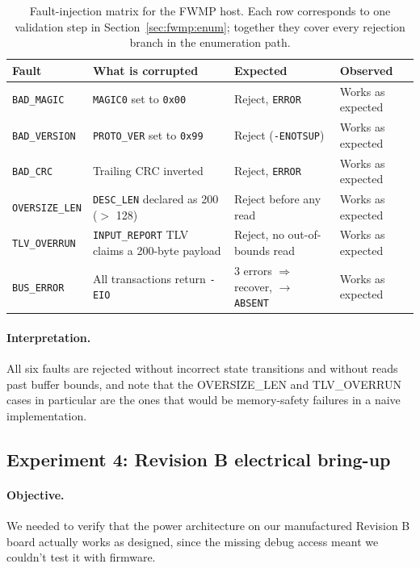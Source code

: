 \documentclass[12pt, a4paper]{article}
\begin{document}
\begin{table}[H]
\centering
\small
\begin{tabular}{@{}l p{5.6cm} l p{3.6cm}@{}}
\toprule
\textbf{Fault} & \textbf{What is corrupted} & \textbf{Expected} & \textbf{Observed} \\
\midrule
\texttt{BAD\_MAGIC} & \texttt{MAGIC0} set to \texttt{0x00} & Reject, \texttt{ERROR} & Works as expected \\
\texttt{BAD\_VERSION} & \texttt{PROTO\_VER} set to \texttt{0x99} & Reject (\texttt{-ENOTSUP}) & Works as expected \\
\texttt{BAD\_CRC} & Trailing CRC inverted & Reject, \texttt{ERROR} & Works as expected \\
\texttt{OVERSIZE\_LEN} & \texttt{DESC\_LEN} declared as 200 ($>$ 128) & Reject before any read & Works as expected \\
\texttt{TLV\_OVERRUN} & \texttt{INPUT\_REPORT} TLV claims a 200-byte payload & Reject, no out-of-bounds read & Works as expected \\
\texttt{BUS\_ERROR} & All transactions return \texttt{-EIO} & 3 errors $\Rightarrow$ recover, $\to$ \texttt{ABSENT} & Works as expected \\
\bottomrule
\end{tabular}
\caption{Fault-injection matrix for the FWMP host. Each row corresponds to one validation step in Section~\ref{sec:fwmp:enum}; together they cover every rejection branch in the enumeration path.}
\label{tab:faults}
\end{table}

\paragraph{Interpretation.} All six faults are rejected without incorrect state transitions and without
reads past buffer bounds, and note that the OVERSIZE\_LEN and TLV\_OVERRUN cases
in particular are the ones that would be memory-safety failures in a naive
implementation.

\subsection{Experiment 4: Revision B electrical bring-up}

\paragraph{Objective.} We needed to verify that the power architecture on our manufactured Revision B board actually works as designed, since the missing debug access meant we couldn't test it with firmware.
\end{document}
